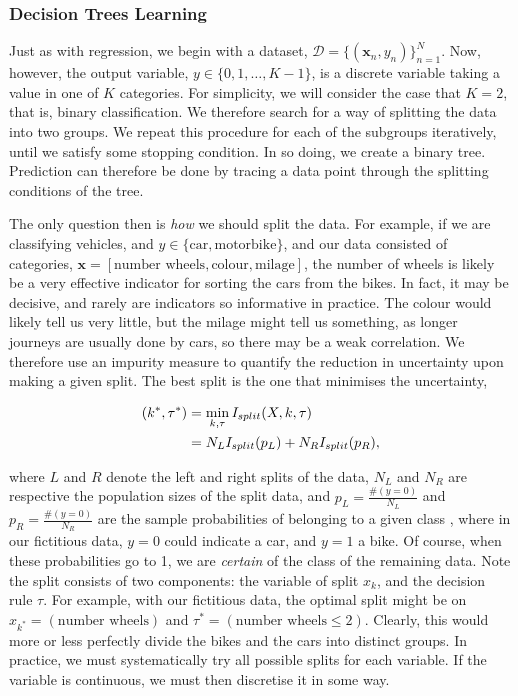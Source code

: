 \documentclass[11pt]{amsart}
\begin{document}
\subsubsection{Decision Trees Learning}

Just as with regression, we begin with a dataset, $\mathcal{D} = \{(\mathbf{x}_n, y_n)\}_{n=1}^{N}$. Now, however, the output variable, $y \in \{0, 1, \dots, K-1\}$, is a discrete variable taking a value in one of $K$ categories. For simplicity, we will consider the case that $K = 2$, that is, binary classification. We therefore search for a way of splitting the data into two groups. We repeat this procedure for each of the subgroups iteratively, until we satisfy some stopping condition. In so doing, we create a binary tree. Prediction can therefore be done by tracing a data point through the splitting conditions of the tree.

The only question then is \emph{how} we should split the data. For example, if we are classifying vehicles, and $y \in \{\text{car}, \text{motorbike}\}$, and our data consisted of categories, $\mathbf{x} = [\text{number wheels}, \text{colour}, \text{milage}]$, the number of wheels is likely be a very effective indicator for sorting the cars from the bikes. In fact, it may be decisive, and rarely are indicators so informative in practice. The colour would likely tell us very little, but the milage might tell us something, as longer journeys are usually done by cars, so there may be a weak correlation. We therefore use an impurity measure to quantify the reduction in uncertainty upon making a given split. The best split is the one that minimises the uncertainty,

\begin{align}
( k^*, \tau^*) &= \min_{k, \tau} I_{split}(X, k, \tau) \notag \\
&= N_LI_{split}(p_L) + N_RI_{split}(p_R), \notag
\end{align}

where $L$ and $R$ denote the left and right splits of the data, $N_L$ and $N_R$ are respective the population sizes of the split data, and $p_L = \frac{\#(y = 0)}{N_L}$ and $p_R = \frac{\#(y = 0)}{N_R}$ are the sample probabilities of belonging to a given class , where in our fictitious data, $y=0$ could indicate a car, and $y=1$ a bike. Of course, when these probabilities go to 1, we are \emph{certain} of the class of the remaining data. Note the split consists of two components: the variable of split $x_k$, and the decision rule $\tau$. For example, with our fictitious data, the optimal split might be on $x_{k^*} = (\text{number wheels})$ and $\tau^* = (\text{number wheels} \leq 2)$. Clearly, this would more or less perfectly divide the bikes and the cars into distinct groups. In practice, we must systematically try all possible splits for each variable. If the variable is continuous, we must then discretise it in some way.
\end{document}
